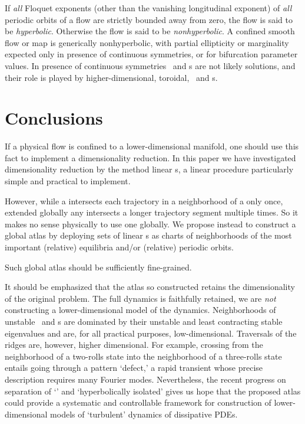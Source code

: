 If {\em all} Floquet exponents (other than the vanishing longitudinal
exponent) of {\em all} periodic orbits of a flow are strictly bounded
away from zero, the flow is said to be {\em hyperbolic}. Otherwise the
flow is said to be {\em nonhyperbolic}. A confined smooth flow or map is
generically nonhyperbolic, with partial {ellipticity}  or {marginality}
expected only in presence of continuous symmetries, or for bifurcation
parameter values. In presence
of continuous symmetries \eqva\ and \po s are not likely solutions, and
their role is played by higher-dimensional, toroidal, \reqva\ and \rpo s.



\section{Conclusions}
    \label{sec:concl}

If a physical flow is confined to a lower-dimensional manifold, one should
use this fact to implement a dimensionality reduction.  In this
paper we have investigated dimensionality reduction by the method
linear {\PoincSec s}, a linear
procedure particularly simple and practical to implement.

 However, while a {\PoincSec} intersects each trajectory
  in a neighborhood of a {\template} only once, extended globally any
{\PoincSec} intersects a longer trajectory segment multiple times. So
it makes no sense physically to use one
{\PoincSec} globally. We propose instead to construct a global atlas by
deploying sets of linear {\PoincSec s} as charts of
neighborhoods of the most important (relative) equilibria and/or
(relative) periodic orbits.

Such global atlas should be sufficiently fine-grained.

It should be emphasized that the atlas so constructed retains the
dimensionality of the original problem. The full dynamics is faithfully
retained, we are \emph{not} constructing a lower-dimensional model of the
dynamics. Neighborhoods of unstable \eqva\ and \po s are dominated by
their unstable and least contracting stable eigenvalues and are, for all
practical purposes, low-dimensional. Traversals of the ridges are,
however, higher dimensional. For example, crossing from the neighborhood
of a two-rolls state into the neighborhood of a three-rolls state entails
going through a pattern `defect,' a rapid transient whose precise
description requires many Fourier modes. Nevertheless, the recent
progress on separation of `{\entangled}' and `hyperbolically isolated'
{\cLvs} gives us
hope that the proposed atlas could provide a systematic and controllable
framework for construction of lower-dimensional models of `turbulent'
dynamics of dissipative PDEs.

